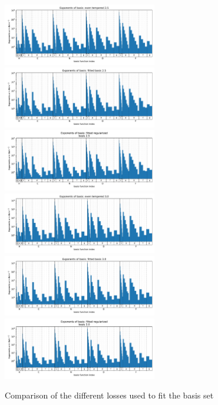 \begin{figure}
    \centering
    \includegraphics[width=0.6\textwidth]{chapters/results/results_images/basis_functions_even_tempered_2.5}
    \includegraphics[width=0.6\textwidth]{chapters/results/results_images/basis_functions_fitted_basis_2.5}
    \includegraphics[width=0.6\textwidth]{chapters/results/results_images/basis_functions_fitted_regularized
basis_2.5}
    \includegraphics[width=0.6\textwidth]{chapters/results/results_images/basis_functions_even_tempered_3.0}
    \includegraphics[width=0.6\textwidth]{chapters/results/results_images/basis_functions_fitted_basis_3.0}
    \includegraphics[width=0.6\textwidth]{chapters/results/results_images/basis_functions_fitted_regularized
basis_3.0}
    \caption{Comparison of the different losses used to fit the basis set}
\end{figure}
 







